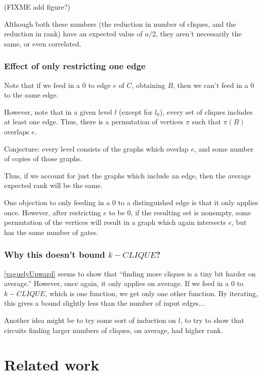 \documentclass[12pt]{article}
\theoremstyle{definition}
\begin{document}
(FIXME add figure?)


Although both these numbers (the reduction in number of cliques, and
the reduction in rank) have an expected value of $a/2$,
they aren't necessarily the same, or even correlated.


\subsubsection{Effect of only restricting one edge}

Note that if we feed in a 0 to edge $e$ of $C$, obtaining $B$, then
we can't feed in a 0 to the same edge.

However, note that in a given level $l$ (except for $l_0$),
every set of cliques includes at least one edge. Thus, there is
a permutation of vertices $\pi$ such that $\pi(B)$ overlaps $e$.

Conjecture: every level consists of the graphs which overlap $e$,
and some number of copies of those graphs.

Thus, if we account for just the graphs which include an edge,
then the average expected rank will be the same.

 



One objection to only feeding in a 0 to a distinguished edge is that
it only applies once. However, after restricting $e$ to be 0,
if the resulting set is nonempty,
some permutation of the vertices will result in a graph which
again intersects $e$, but has the same number of gates. 






\subsubsection{Why this doesn't bound $k-CLIQUE$?}

\ref{vaguelyUpward} seems to show that ``finding more cliques is
a tiny bit harder on average.'' However, once again, it only applies
on average. If we feed in a 0 to $k-CLIQUE$, which is one function,
we get only one other function. By iterating, this gives a bound
slightly less than the number of input edges...

Another idea might be to try some sort of induction on $l$, to
try to show that circuits finding larger
numbers of cliques, on average, had higher rank.

\section{Related work}
\end{document}
